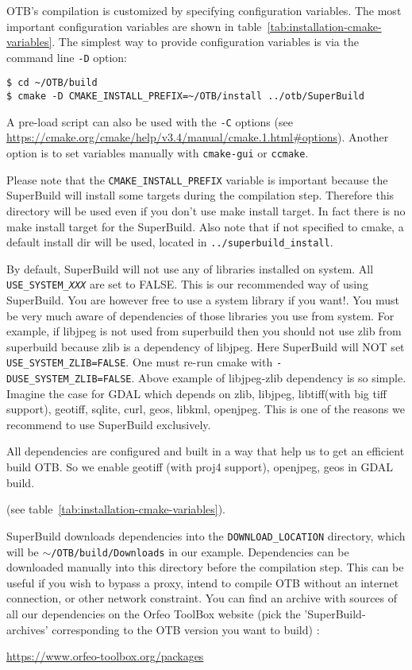 OTB's compilation is customized by specifying configuration variables.  The most
important configuration variables are shown in
table~\ref{tab:installation-cmake-variables}.  The simplest way to provide
configuration variables is via the command line \texttt{-D} option:
\begin{verbatim}
$ cd ~/OTB/build
$ cmake -D CMAKE_INSTALL_PREFIX=~/OTB/install ../otb/SuperBuild
\end{verbatim}
A pre-load script can also be used with the \texttt{-C} options (see
\url{https://cmake.org/cmake/help/v3.4/manual/cmake.1.html#options}).
Another option is to set variables manually with \texttt{cmake-gui}
or \texttt{ccmake}.

Please note that the \texttt{CMAKE\_INSTALL\_PREFIX} variable is
important because the SuperBuild will install some targets during the
compilation step.  Therefore this directory will be used even if you
don't use make install target.  In fact there is no make install
target for the SuperBuild. Also note that if not specified to cmake, a
default install dir will be used, located in \texttt{../superbuild\_install}.

By default, SuperBuild will not use any of libraries installed on
system. All \texttt{USE\_SYSTEM\_\textit{XXX}} are set to FALSE. This is our
recommended way of using SuperBuild. You are however free to use a system
library if you want!. You must be very much aware of dependencies of those
libraries you use from system. For example, if libjpeg is not used from
superbuild then you should not use zlib from superbuild because zlib is a dependency of libjpeg.
Here SuperBuild will NOT set \texttt{USE\_SYSTEM\_ZLIB=FALSE}. One must re-run cmake
with \texttt{-DUSE\_SYSTEM\_ZLIB=FALSE}.
Above example of libjpeg-zlib dependency is so simple.  Imagine
the case for GDAL which depends on zlib, libjpeg, libtiff(with big tiff
support), geotiff, sqlite, curl, geos, libkml, openjpeg. This is one of the
reasons we recommend to use SuperBuild exclusively.

All dependencies are configured and built in a way that help us to get an
efficient build OTB.  So we enable geotiff (with proj4 support), openjpeg, geos
in GDAL build.

(see table~\ref{tab:installation-cmake-variables}).

SuperBuild downloads dependencies into the \texttt{DOWNLOAD\_LOCATION}
directory, which will be
\texttt{$\sim$/OTB/build/Downloads} in our example.
Dependencies can be downloaded manually into this directory before the
compilation step.  This can be useful if you wish to bypass a proxy, intend to
compile OTB without an internet connection, or other network constraint. You can
find an archive with sources of all our dependencies on the Orfeo ToolBox
website (pick the 'SuperBuild-archives' corresponding to the OTB version you
want to build) :
\begin{center}
\url{https://www.orfeo-toolbox.org/packages}
\end{center}


